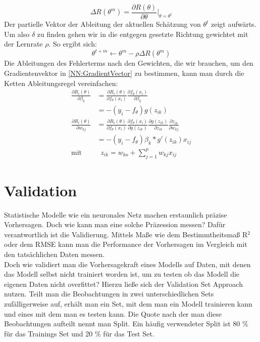 \documentclass[a4paper,12pt]{thesis}
\begin{document}
\begin{equation}
	\label{NN:GradientVector}
	\Delta R(\theta^m)=\frac{\partial R(\theta)}{\partial \theta}|_{\theta=\theta^t}
\end{equation}
Der partielle Vektor der Ableitung der aktuellen Schätzung von $\theta^t$ zeigt aufwärts. Um also $\delta$ zu finden gehen wir in die entgegen gesetzte Richtung gewichtet mit der Lernrate $\rho$. So ergibt sich:
\begin{equation}
	\label{NN:Lernfunktion}
	\theta^{t+m} \leftarrow \theta^m -\rho \Delta R(\theta^m)
\end{equation}
Die Ableitungen des Fehlerterms nach den Gewichten, die wir brauchen, um den Gradientenvektor in \ref{NN:GradientVector} zu bestimmen, kann man durch die Ketten Ableitungsregel vereinfachen:
\begin{equation}
	\label{NN:ChainRule}
	\begin{aligned}
		\frac{\partial R_i(\theta)}{\partial \beta_k}& = \frac{\partial R_i(\theta)}{\partial f_{\theta} (x_i)} \frac{\partial f_{\theta} (x_i)}{\partial \beta_k}\\
		& = -(y_i - f_{\theta})g(z_{ik})\\
		\frac{\partial R_i(\theta)}{\partial w_{kj}}& = \frac{\partial R_i(\theta)}{\partial f_{\theta} (x_i)} \frac{\partial f_{\theta} (x_i)}{\partial g(z_{ik})} \frac{\partial g(z_{ik}) }{\partial z_{ik}} \frac{\partial z_{ik}}{\partial w_{kj}}\\
		& = -(y_i - f_{\theta})\beta_k*g'(z_{ik})x_{ij}\\
		\text{mit}& \; \; z_{ik}=w_{ko}+ \sum^p_{j=1}w_{kj}x_{ij}
	\end{aligned} 
\end{equation}

\section{Validation}

Statistische Modelle wie ein neuronales Netz machen erstaunlich präzise Vorhersagen. Doch wie kann man eine solche Präzession messen? Dafür verantwortlich ist die Validierung. Mittels Maße wie dem Bestimmtheitsmaß R$^2$ oder dem RMSE kann man die Performance der Vorhersagen im Vergleich mit den tatsächlichen Daten messen.\\
Doch wie validiert man die Vorhersagekraft eines Modells auf Daten, mit denen das Modell selbst nicht trainiert worden ist, um zu testen ob das Modell die eigenen Daten nicht overfittet? Hierzu ließe sich der Validation Set Approach nutzen. Teilt man die Beobachtungen in zwei unterschiedlichen Sets zufälligerweise auf, erhält man ein Set, mit dem man ein Modell trainieren kann und eines mit dem man es testen kann. Die Quote nach der man diese Beobachtungen aufteilt nennt man Split. Ein häufig verwendeter Split ist 80 \% für das Trainings Set und 20 \% für das Test Set.
\end{document}
